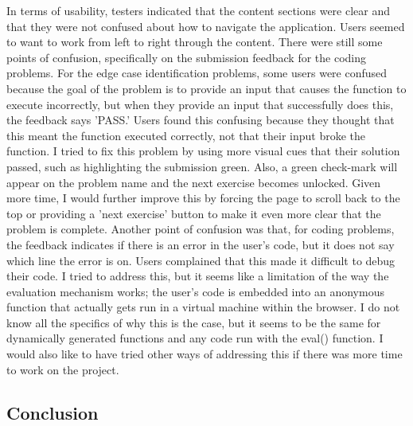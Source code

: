 \documentclass[10pt,twocolumn]{article}
\begin{document}
In terms of usability, testers indicated that the content sections were clear and that they were not confused about how to navigate 
the application. Users seemed to want to work from 
left to right through the content. There were still some points of confusion, specifically on the submission feedback 
for the coding problems. For the edge case identification problems, some users were confused because the goal of the 
problem is to provide an input that causes the function to execute incorrectly, but when they provide an input that 
successfully does this, the feedback says 'PASS.' Users found this confusing because they thought that this meant 
the function executed correctly, not that their input broke the function. I tried to fix this problem by using more visual
cues that their solution passed, such as highlighting the submission green. Also, a green check-mark will appear 
on the problem name and the next exercise becomes unlocked. Given more time, I would further improve this by forcing the 
page to scroll back to the top or providing a 'next exercise' button to make it even more clear that the problem is complete. 
Another point of confusion was that, for coding problems, the feedback indicates if there is an error in the user's code, but it does not say 
which line the error is on. Users complained that this made it difficult to debug their code. I tried to address this,
but it seems like a limitation of the way the evaluation mechanism works; the user's code is embedded into an anonymous 
function that actually gets run in a virtual machine within the browser. I do not know all the specifics of why this is 
the case, but it seems to be the same for dynamically generated functions and any code run with the eval() function. 
I would also like to have tried other ways of addressing this if there was more time to work on the project. 

\subsection{Conclusion}
\end{document}
